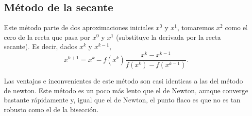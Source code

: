 \begin{center}
\end{center}

\subsection{Método de la secante}

Este método parte de dos aproximaciones iniciales $x^0$ y $x^1$, tomaremos $x^2$ como el cero de la recta
que pasa por $x^0$ y $x^1$ (substituye la derivada por la recta secante). Es decir, dados $x^k$ y $x^{k-1}$,
\[
    x^{k+1} = x^k - f\left( x^k \right) \frac{x^k - x^{k-1}}{f\left( x^k \right) - f\left( x^{k-1} \right)}.
\]

Las ventajas e inconvenientes de este método son casi identicas a las del método de newton. Este método
es un poco más lento que el de Newton, aunque converge bastante rápidamente y, igual que el de Newton,
el punto flaco es que no es tan robusto como el de la bisección.

